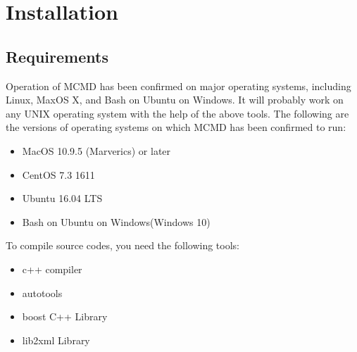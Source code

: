 \newpage
\section{Installation\label{sect:install}}
\subsection{Requirements}
Operation of MCMD has been confirmed on major operating systems, including Linux, MaxOS X, and Bash on Ubuntu on Windows. It will probably work on any UNIX operating system with the help of the above tools. The following are the versions of operating systems on which MCMD has been confirmed to run:

\begin{itemize}
\item	MacOS 10.9.5 (Marverics) or later
\item CentOS 7.3 1611
\item Ubuntu 16.04 LTS
\item Bash on Ubuntu on Windows(Windows 10)
\end{itemize}

To compile source codes, you need the following tools:
\begin{itemize}
\item	c++ compiler
\item autotools
\item boost C++ Library
\item lib2xml Library
\end{itemize}


